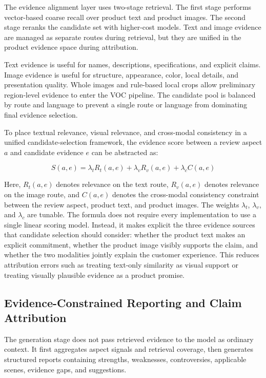 \documentclass[11pt]{article}
\begin{document}
The evidence alignment layer uses two-stage retrieval. The first stage performs vector-based coarse recall over product text and product images. The second stage reranks the candidate set with higher-cost models. Text and image evidence are managed as separate routes during retrieval, but they are unified in the product evidence space during attribution.

Text evidence is useful for names, descriptions, specifications, and explicit claims. Image evidence is useful for structure, appearance, color, local details, and presentation quality. Whole images and rule-based local crops allow preliminary region-level evidence to enter the VOC pipeline. The candidate pool is balanced by route and language to prevent a single route or language from dominating final evidence selection.

To place textual relevance, visual relevance, and cross-modal consistency in a unified candidate-selection framework, the evidence score between a review aspect \(a\) and candidate evidence \(e\) can be abstracted as:

\[
S(a,e) = \lambda_t R_t(a,e) + \lambda_v R_v(a,e) + \lambda_c C(a,e)
\]

Here, \(R_t(a,e)\) denotes relevance on the text route, \(R_v(a,e)\) denotes relevance on the image route, and \(C(a,e)\) denotes the cross-modal consistency constraint between the review aspect, product text, and product images. The weights \(\lambda_t\), \(\lambda_v\), and \(\lambda_c\) are tunable. The formula does not require every implementation to use a single linear scoring model. Instead, it makes explicit the three evidence sources that candidate selection should consider: whether the product text makes an explicit commitment, whether the product image visibly supports the claim, and whether the two modalities jointly explain the customer experience. This reduces attribution errors such as treating text-only similarity as visual support or treating visually plausible evidence as a product promise.

\subsection{Evidence-Constrained Reporting and Claim Attribution}

The generation stage does not pass retrieved evidence to the model as ordinary context. It first aggregates aspect signals and retrieval coverage, then generates structured reports containing strengths, weaknesses, controversies, applicable scenes, evidence gaps, and suggestions.
\end{document}

